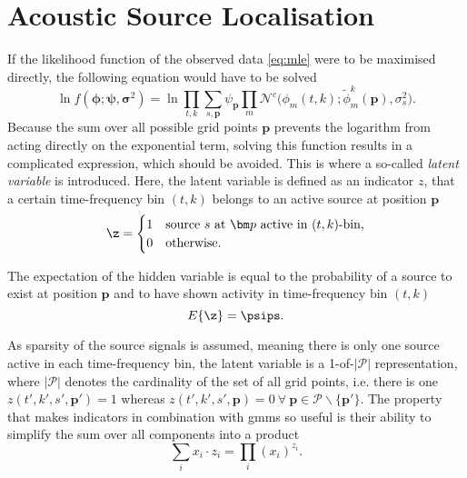 \section{Acoustic Source Localisation}
\label{sec:algLocEst}

If the likelihood function of the observed data \eqref{eq:mle} were to be maximised directly, the following equation would have to be solved
\begin{equation}
    \ln f(\bm\phi;\bm\psi,\bm\sigma^2) = \ln\prod_{t,k}\sum_{s,\bm p}\psi_{\bm p}\prod_m\mathcal{N}^c\big(\phi_m(t,k);\tilde\phi^k_m(\bm p),\sigma^2_{s}\big).
\end{equation}
Because the sum over all possible grid points $\bm p$ prevents the logarithm from acting directly on the exponential term, solving this function results in a complicated expression, which should be avoided. This is where a so-called \textit{latent variable} is introduced. Here, the latent variable is defined as an indicator $z$, that a certain time-frequency bin $(t,k)$ belongs to an active source at position $\bm p$ 
\begin{equation}
	\z=\begin{cases}
	    1& \text{source $s$ at $\bm p$ active in $(t,k)$-bin},\\
       0& \text{otherwise}.
	\end{cases}
\end{equation}

The expectation of the hidden variable is equal to the probability of a source to exist at position $\bm p$ and to have shown activity in time-frequency bin $(t, k)$ 
\begin{equation}
    E\{\z\}=\psips.
\end{equation}

As sparsity of the source signals is assumed, meaning there is only one source active in each time-frequency bin, the latent variable is a 1-of-$|\mathcal{P}|$ representation, where $|\mathcal{P}|$ denotes the cardinality of the set of all grid points, i.e. there is one $z(t',k',s',\bm p')=1$ whereas $z(t',k',s',\bm p)=0\ \forall\ \bm p\in\mathcal{P}\smallsetminus\{\bm p'\}$. The property that makes indicators in combination with \glspl{gmm} so useful is their ability to simplify the sum over all components into a product
\begin{equation}
\label{eq:indicator-sum-product}
    \sum_{i}x_i\cdot z_i=\prod_i (x_i)^{z_i}.
\end{equation}

